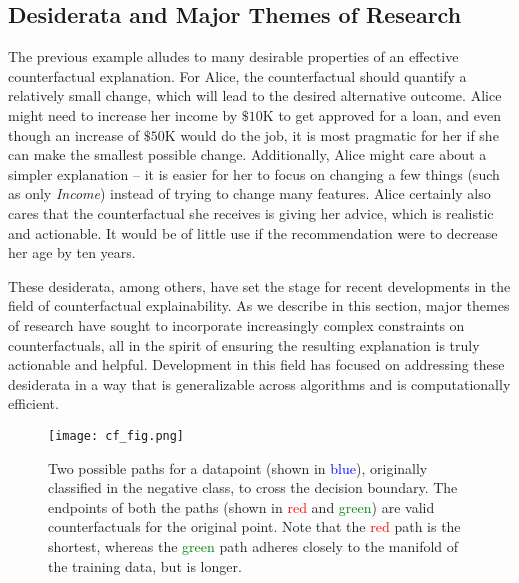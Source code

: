 \subsection{Desiderata and Major Themes of Research}
\label{sec:themes}


The previous example alludes to many desirable properties of an effective counterfactual explanation. For Alice, the counterfactual should quantify a relatively small change, which will lead to the desired alternative outcome. Alice might need to increase her income by $\$10$K to get approved for a loan, and even though an increase of $\$50$K would do the job, it is most pragmatic for her if she can make the smallest possible change. Additionally, Alice might care about a simpler explanation -- it is easier for her to focus on changing a few things (such as only \emph{Income}) instead of trying to change many features. Alice certainly also cares that the counterfactual she receives is giving her advice, which is realistic and actionable. It would be of little use if the recommendation were to decrease her age by ten years. 

These desiderata, among others, have set the stage for recent developments in the field of counterfactual explainability. As we describe in this section, major themes of research have sought to incorporate increasingly complex constraints on counterfactuals, all in the spirit of ensuring the resulting explanation is truly actionable and helpful. 
Development in this field has focused on addressing these desiderata in a way that is generalizable across algorithms and is computationally efficient. 

\belowcaptionskip=-3pt
\abovecaptionskip=3pt
\begin{figure}
    \centering
    \texttt{[image: cf\_fig.png]}
    \caption{Two possible paths for a datapoint (shown in \textcolor{blue}{blue}), originally classified in the negative class, to cross the decision boundary. The endpoints of both the paths (shown in \textcolor{red}{red} and \textcolor{green}{green}) are valid counterfactuals for the original point. Note that the \textcolor{red}{red} path is the shortest, whereas the \textcolor{green}{green} path adheres closely to the manifold of the training data, but is longer.}
    \label{fig:cf_fig}
\end{figure}

